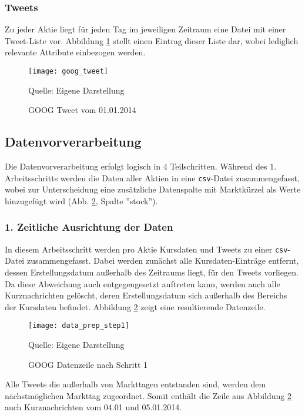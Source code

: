\subsubsection*{Tweets}\label{sec:data_ingestion_tweetdata}
Zu jeder Aktie liegt für jeden Tag im jeweiligen Zeitraum eine Datei mit einer Tweet-Liste vor. Abbildung \ref{fig:goog_tweet} stellt einen Eintrag dieser Liste dar, wobei lediglich relevante Attribute einbezogen werden.
\begin{figure}[H]
	\caption{GOOG Tweet vom 01.01.2014}
	\texttt{[image: goog\_tweet]}
	\label{fig:goog_tweet}
	\raggedright
	\normalsize{Quelle: Eigene Darstellung}
	\vspace{-1.0em}
\end{figure}


\subsection{Datenvorverarbeitung}

Die Datenvorverarbeitung erfolgt logisch in $4$ Teilschritten. Während des 1. Arbeitsschritts werden die Daten aller Aktien in eine \texttt{csv}-Datei zusammengefasst, wobei zur Unterscheidung eine zusätzliche Datenspalte mit Marktkürzel als Werte hinzugefügt wird (Abb. \ref{fig:data_prep_step1}, Spalte ''stock'').

\subsubsection*{1. Zeitliche Ausrichtung der Daten}

In diesem Arbeitsschritt werden pro Aktie Kursdaten und Tweets zu einer \texttt{csv}-Datei zusammengefasst. Dabei werden zunächst alle Kursdaten-Einträge entfernt, dessen Erstellungsdatum außerhalb des Zeitraums liegt, für den Tweets vorliegen. Da diese Abweichung auch entgegengesetzt auftreten kann, werden auch alle Kurznachrichten gelöscht, deren Erstellungsdatum sich außerhalb des Bereichs der Kursdaten befindet. Abbildung \ref{fig:data_prep_step1} zeigt eine resultierende Datenzeile.
\begin{figure}[H]
	\caption{GOOG Datenzeile nach Schritt 1}
	\texttt{[image: data\_prep\_step1]}
	\label{fig:data_prep_step1}
	\raggedright
	\normalsize{Quelle: Eigene Darstellung}
	\vspace{-1.0em}
\end{figure}
Alle Tweets die außerhalb von Markttagen entstanden sind, werden dem nächstmöglichen Markttag zugeordnet. Somit enthält die Zeile aus Abbildung \ref{fig:data_prep_step1} auch Kurznachrichten vom 04.01 und 05.01.2014. 


